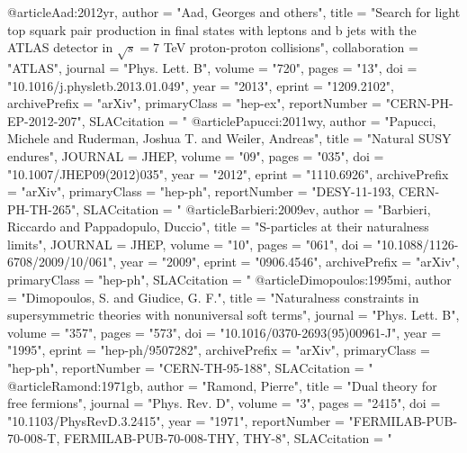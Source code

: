@article{Aad:2012yr,
      author         = "Aad, Georges and others",
      title          = "{Search for light top squark pair production in final
                        states with leptons and b jets with the ATLAS detector
                        in $\sqrt{s}=7$ TeV proton-proton collisions}",
      collaboration  = "ATLAS",
      journal        = "Phys. Lett. B",
      volume         = "720",
      pages          = "13",
      doi            = "10.1016/j.physletb.2013.01.049",
      year           = "2013",
      eprint         = "1209.2102",
      archivePrefix  = "arXiv",
      primaryClass   = "hep-ex",
      reportNumber   = "CERN-PH-EP-2012-207",
      SLACcitation   = "%
}
@article{Papucci:2011wy,
      author         = "Papucci, Michele and Ruderman, Joshua T. and Weiler,
                        Andreas",
      title          = "{Natural {SUSY} endures}",
      JOURNAL        = {JHEP},
      volume         = "09",
      pages          = "035",
      doi            = "10.1007/JHEP09(2012)035",
      year           = "2012",
      eprint         = "1110.6926",
      archivePrefix  = "arXiv",
      primaryClass   = "hep-ph",
      reportNumber   = "DESY-11-193, CERN-PH-TH-265",
      SLACcitation   = "%
}
@article{Barbieri:2009ev,
      author         = "Barbieri, Riccardo and Pappadopulo, Duccio",
      title          = "{S-particles at their naturalness limits}",
      JOURNAL        = {JHEP},
      volume         = "10",
      pages          = "061",
      doi            = "10.1088/1126-6708/2009/10/061",
      year           = "2009",
      eprint         = "0906.4546",
      archivePrefix  = "arXiv",
      primaryClass   = "hep-ph",
      SLACcitation   = "%
}
@article{Dimopoulos:1995mi,
      author         = "Dimopoulos, S. and Giudice, G. F.",
      title          = "{Naturalness constraints in supersymmetric theories with
                        nonuniversal soft terms}",
      journal        = "Phys. Lett. B",
      volume         = "357",
      pages          = "573",
      doi            = "10.1016/0370-2693(95)00961-J",
      year           = "1995",
      eprint         = "hep-ph/9507282",
      archivePrefix  = "arXiv",
      primaryClass   = "hep-ph",
      reportNumber   = "CERN-TH-95-188",
      SLACcitation   = "%
}
@article{Ramond:1971gb,
      author         = "Ramond, Pierre",
      title          = "{Dual theory for free fermions}",
      journal        = "Phys. Rev. D",
      volume         = "3",
      pages          = "2415",
      doi            = "10.1103/PhysRevD.3.2415",
      year           = "1971",
      reportNumber   = "FERMILAB-PUB-70-008-T, FERMILAB-PUB-70-008-THY, THY-8",
      SLACcitation   = "%
}

